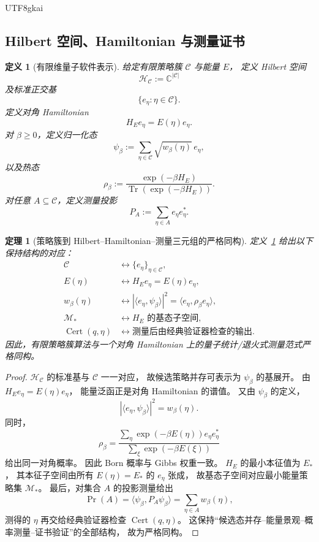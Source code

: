 \documentclass[12pt]{article}
\newtheorem{definition}{定义}[section]
\newtheorem{theorem}{定理}[section]
\newcommand{\CC}{\mathbb{C}}
\newcommand{\Hilb}{\mathcal H}
\newcommand{\Cert}{\operatorname{Cert}}
\begin{document}
\begin{CJK*}{UTF8}{gkai}
\subsection{Hilbert 空间、Hamiltonian 与测量证书}
\label{subsec:tex53-hilbert-closure}

\begin{definition}[有限维量子软件表示]
\label{def:tex53-finite-quantum-software}
给定有限策略簇 \(\mathcal C\) 与能量 \(E\)，
定义 Hilbert 空间
\[
  \Hilb_{\mathcal C}
  :=
  \CC^{|\mathcal C|}
\]
及标准正交基
\[
  \{e_\eta:\eta\in\mathcal C\}.
\]
定义对角 Hamiltonian
\[
  H_E e_\eta = E(\eta)e_\eta.
\]
对 \(\beta\ge0\)，定义归一化态
\[
  \psi_\beta
  :=
  \sum_{\eta\in\mathcal C}\sqrt{w_\beta(\eta)}\,e_\eta,
\]
以及热态
\[
  \rho_\beta
  :=
  \frac{\exp(-\beta H_E)}
       {\operatorname{Tr}(\exp(-\beta H_E))}.
\]
对任意 \(A\subseteq\mathcal C\)，定义测量投影
\[
  P_A:=\sum_{\eta\in A}e_\eta e_\eta^\ast.
\]
\end{definition}

\begin{theorem}[策略簇到 Hilbert--Hamiltonian--测量三元组的严格同构]
\label{thm:tex53-hilbert-hamiltonian-isomorphism}
定义~\ref{def:tex53-finite-quantum-software} 给出以下保持结构的对应：
\[
\begin{aligned}
  \mathcal C
  &\longleftrightarrow
  \{e_\eta\}_{\eta\in\mathcal C},\\
  E(\eta)
  &\longleftrightarrow
  H_E e_\eta=E(\eta)e_\eta,\\
  w_\beta(\eta)
  &\longleftrightarrow
  |\langle e_\eta,\psi_\beta\rangle|^2
  =
  \langle e_\eta,\rho_\beta e_\eta\rangle,\\
  \mathcal M_\ast
  &\longleftrightarrow
  \text{\(H_E\) 的基态子空间},\\
  \Cert(q,\eta)
  &\longleftrightarrow
  \text{测量后由经典验证器检查的输出}.
\end{aligned}
\]
因此，有限策略簇算法与一个对角 Hamiltonian 上的量子统计/退火式测量范式严格同构。
\end{theorem}

\begin{proof}
\(\Hilb_{\mathcal C}\) 的标准基与 \(\mathcal C\) 一一对应，
故候选策略并存可表示为 \(\psi_\beta\) 的基展开。
由 \(H_E e_\eta=E(\eta)e_\eta\)，
能量泛函正是对角 Hamiltonian 的谱值。
又由 \(\psi_\beta\) 的定义，
\[
  |\langle e_\eta,\psi_\beta\rangle|^2
  =
  w_\beta(\eta).
\]
同时，
\[
  \rho_\beta
  =
  \frac{\sum_{\eta}\exp(-\beta E(\eta))e_\eta e_\eta^\ast}
       {\sum_{\xi}\exp(-\beta E(\xi))}
\]
给出同一对角概率。
因此 Born 概率与 Gibbs 权重一致。
\(H_E\) 的最小本征值为 \(E_\ast\)，
其本征子空间由所有 \(E(\eta)=E_\ast\) 的 \(e_\eta\) 张成，
故基态子空间对应最小能量策略集 \(\mathcal M_\ast\)。
最后，对集合 \(A\) 的投影测量给出
\[
  \Pr(A)=\langle\psi_\beta,P_A\psi_\beta\rangle
  =
  \sum_{\eta\in A}w_\beta(\eta),
\]
测得的 \(\eta\) 再交给经典验证器检查 \(\Cert(q,\eta)\)。
这保持“候选态并存--能量景观--概率测量--证书验证”的全部结构，
故为严格同构。
\end{proof}


\end{CJK*}
\end{document}
